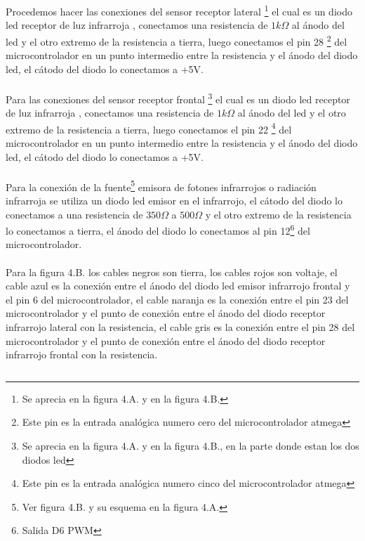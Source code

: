 \documentclass[12]{article}
\newenvironment{Figure}
{\par\medskip\noindent\minipage{\linewidth}}
{\endminipage\par\medskip}
\begin{document}
\begin{multicols}{2}
Procedemos hacer las conexiones del sensor receptor lateral \footnote{Se aprecia en la figura 4.A. y en la figura 4.B.} el cual es un diodo led receptor de luz infrarroja \cite{INFRARED}, conectamos una resistencia de $1 k\Omega$ al ánodo del led y el otro extremo de la resistencia a tierra, luego conectamos el pin 28 \footnote{Este pin es la entrada analógica numero cero del microcontrolador atmega} del microcontrolador en un punto intermedio entre la resistencia y el ánodo del diodo led, el cátodo del diodo lo conectamos a +5V.\\\\
Para las conexiones del sensor receptor frontal \footnote{Se aprecia en la figura 4.A. y en la figura 4.B., en la parte donde estan los dos diodos led} el cual es un diodo led receptor de luz infrarroja \cite{INFRARED}, conectamos una resistencia de $1 k\Omega$ al ánodo del led y el otro extremo de la resistencia a tierra, luego conectamos el pin 22 \footnote{Este pin es la entrada analógica numero cinco del microcontrolador atmega} del microcontrolador en un punto intermedio entre la resistencia y el ánodo del diodo led, el cátodo del diodo lo conectamos a +5V.\\\\
Para la conexión de la fuente\footnote{Ver figura 4.B. y su esquema en la figura 4.A.} emisora de fotones infrarrojos o radiación infrarroja se utiliza un diodo led emisor en el infrarrojo, el cátodo del diodo lo conectamos a una resistencia de $350 \Omega$ a $500 \Omega$ y el otro extremo de la resistencia lo conectamos a tierra, el ánodo del diodo lo conectamos al pin 12\footnote{Salida D6 PWM} del microcontrolador. \\\\
Para la figura 4.B. los cables negros son tierra, los cables rojos son voltaje, el cable azul es la conexión entre el ánodo del diodo led emisor infrarrojo frontal y el pin 6 del microcontrolador, el cable naranja es la conexión entre el pin 23 del microcontrolador y el punto de conexión entre el ánodo del  diodo receptor infrarrojo lateral con la resistencia, el cable gris  es la conexión entre el pin 28 del microcontrolador y el punto de conexión entre el ánodo del diodo receptor infrarrojo frontal con la resistencia.
\begin{Figure}
\center
\begin{tabular}{|l|r|}
\hline

\end{tabular}
\end{Figure}
\end{multicols}
\end{document}
